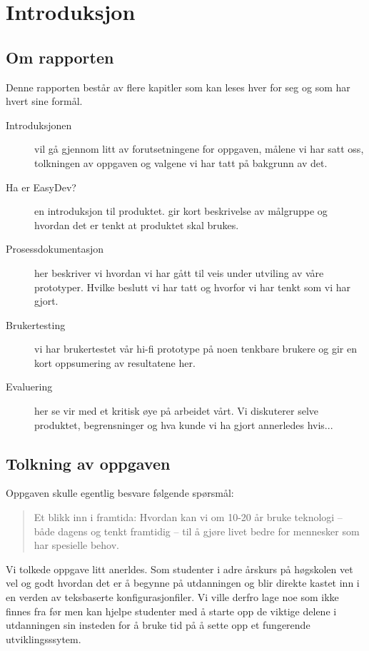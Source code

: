 \chapter{Introduksjon}

\section{Om rapporten}
Denne rapporten består av flere kapitler som kan leses hver for seg og som har hvert sine formål.


\begin{description}

\item[Introduksjonen] vil gå gjennom litt av forutsetningene for oppgaven, målene vi har satt oss, tolkningen av oppgaven og valgene vi har tatt på bakgrunn av det. 

\item[Ha er EasyDev?] en introduksjon til produktet. gir kort beskrivelse av målgruppe og hvordan det er tenkt at produktet skal brukes.

\item[Prosessdokumentasjon] her beskriver vi hvordan vi har gått til veis under utviling av våre prototyper. Hvilke beslutt vi har tatt og hvorfor vi har tenkt som vi har gjort.

\item[Brukertesting] vi har brukertestet vår hi-fi prototype på noen tenkbare brukere og gir en kort oppsumering av resultatene her.

\item[Evaluering] her se vir med et kritisk øye på arbeidet vårt. Vi diskuterer selve produktet, begrensninger og hva kunde vi ha gjort annerledes hvis...

\end{description}



\section{Tolkning av oppgaven}
Oppgaven skulle egentlig besvare følgende spørsmål: 
\begin{quote}
Et	blikk	inn	i	framtida:	Hvordan	kan	vi	om	10-20	år	bruke	teknologi	
– både	dagens	og	tenkt	framtidig	– til	å	gjøre	livet	bedre	for	
mennesker	som	har	spesielle behov.
\end{quote}

Vi tolkede oppgave litt anerldes. Som studenter i adre årskurs på høgskolen vet vel og godt hvordan det er å begynne på utdanningen og blir direkte kastet inn i en verden av teksbaserte konfigurasjonfiler. Vi ville derfro lage noe som ikke finnes fra før men kan hjelpe studenter med å starte opp de viktige delene i utdanningen sin insteden for å bruke tid på å sette opp et fungerende utviklingsssytem. 

